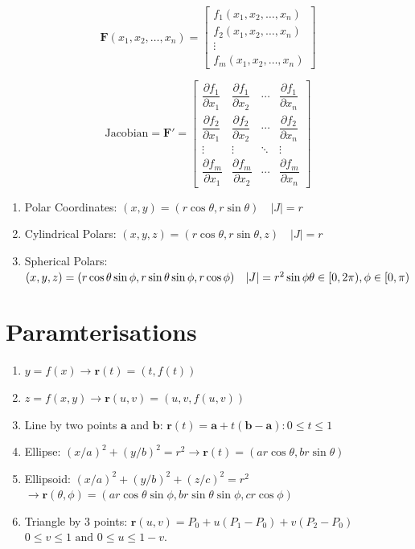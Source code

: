 \documentclass[10pt]{article}
\begin{document}
\noindent
\begin{minipage}[t]{0.38\linewidth}
  \[
    \mathbf{F}(x_1,x_2,\ldots,x_n) =
    \begin{bmatrix}
      f_1(x_1,x_2,\ldots,x_n) \\
      f_2(x_1,x_2,\ldots,x_n) \\
      \vdots \\
      f_m(x_1,x_2,\ldots,x_n)
    \end{bmatrix}
  \]
\end{minipage}%
\begin{minipage}[t]{0.62\linewidth}
  \[
    \text{Jacobian} = \mathbf{F}' =
    \begin{bmatrix}
      \dfrac{\partial f_1}{\partial x_1} & \dfrac{\partial f_1}{\partial x_2} & \cdots & \dfrac{\partial
      f_1}{\partial x_n} \\
      \dfrac{\partial f_2}{\partial x_1} & \dfrac{\partial f_2}{\partial x_2} & \cdots & \dfrac{\partial
      f_2}{\partial x_n} \\
      \vdots & \vdots & \ddots & \vdots \\
      \dfrac{\partial f_m}{\partial x_1} & \dfrac{\partial f_m}{\partial x_2} & \cdots & \dfrac{\partial
      f_m}{\partial x_n}
    \end{bmatrix}
  \]
\end{minipage}
\begin{enumerate}
  \item Polar Coordinates: $(x,y) = (r\cos\theta,r\sin\theta) \quad |J| = r$
  \item Cylindrical Polars: $(x,y,z)=(r\cos\theta,r\sin\theta,z)\quad |J| = r$
  \item Spherical Polars: $(x,y,z)=(r\cos\theta\sin\phi,r\sin\theta\sin\phi,r\cos\phi)\quad |J| = r^2
    \sin\phi \\
    \theta \in [0,2\pi), \phi \in [0,\pi)$
\end{enumerate}
\section*{Paramterisations}
\begin{enumerate}
  \item $y=f(x) \to \mathbf{r}(t)=(t,f(t))$
  \item $z=f(x,y) \to \mathbf{r}(u,v)=(u,v,f(u,v))$
  \item Line by two points $\mathbf{a}$ and $\mathbf{b}$:
    $\mathbf{r}(t)=\mathbf{a}+t(\mathbf{b}-\mathbf{a}):0\le t \le 1$
  \item Ellipse: $(x/a)^2 + (y/b)^2 = r^2 \to \mathbf{r}(t)=(ar\cos\theta,br\sin\theta)$
  \item Ellipsoid: $(x/a)^2 + (y/b)^2 + (z/c)^2 = r^2$ \\
    $\to \mathbf{r}(\theta,\phi)=(ar\cos\theta\sin\phi,br\sin\theta\sin\phi,cr\cos\phi)$
  \item Triangle by 3 points: $\mathbf{r}(u,v)=P_0+u(P_1-P_0)+v(P_2-P_0)$ \quad $0 \le v \le 1 \text{ and } 0
    \le u \le 1-v$.
\end{enumerate}
\end{document}
